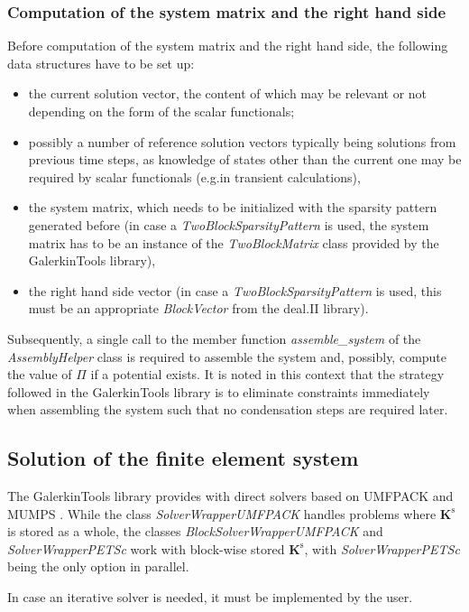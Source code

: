 \documentclass[pdftex,a4paper,12pt,abstracton]{scrartcl}
\begin{document}
\subsubsection{Computation of the system matrix and the right hand side}
Before computation of the system matrix and the right hand side, the following data structures have to be set up:
\begin{itemize}
 \item the current solution vector, the content of which may be relevant or not depending on the form of the scalar functionals;
 \item possibly a number of reference solution vectors typically being solutions from previous time steps, as knowledge of states other than the current one may be required by scalar functionals (e.g.\@ in transient calculations),
 \item the system matrix, which needs to be initialized with the sparsity pattern generated before (in case a \textit{TwoBlockSparsityPattern} is used, the system matrix has to be an instance of the \textit{TwoBlockMatrix} class provided by the GalerkinTools library),
 \item the right hand side vector (in case a \textit{TwoBlockSparsityPattern} is used, this must be an appropriate \textit{BlockVector} from the deal.II library). 
\end{itemize}
Subsequently, a single call to the member function \textit{assemble\_system} of the \textit{AssemblyHelper} class is required to assemble the system and, possibly, compute the value of $\Pi$ if a potential exists. It is noted in this context that the strategy followed in the GalerkinTools library is to eliminate constraints immediately when assembling the system such that no condensation steps are required later.

\subsection{Solution of the finite element system}
The GalerkinTools library provides with direct solvers based on UMFPACK \citep{davis2004} and MUMPS \citep{amestoy2001, amestoy2006}. While the class \textit{SolverWrapperUMFPACK} handles problems where $\boldsymbol{K^\mathrm{s}}$ is stored as a whole, the classes \textit{BlockSolverWrapperUMFPACK} and \textit{SolverWrapperPETSc} work with block-wise stored $\boldsymbol{K^\mathrm{s}}$, with \textit{SolverWrapperPETSc} being the only option in parallel.

In case an iterative solver is needed, it must be implemented by the user.
\end{document}
